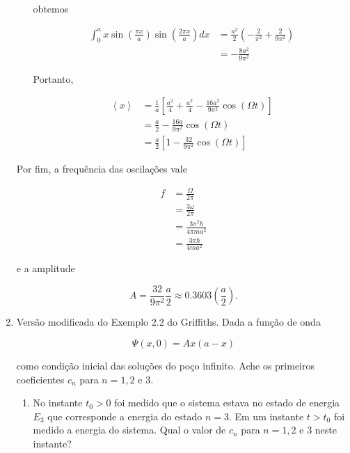 \documentclass[a4paper, 12pt, notitlepage]{article}
\begin{document}
\begin{enumerate}
\begin{enumerate}
  obtemos
  
  \begin{align*}
  \int_0^a x \sin\left(\frac{\pi x}{a}\right) \sin\left(\frac{2\pi x}{a}\right) dx &= \frac{a^2}{2} \left(-\frac{2}{\pi^2} + \frac{2}{9\pi^2}\right) \\
  &= -\frac{8a^2}{9\pi^2}
  \end{align*}
  
  Portanto,
  
  \begin{align*}
  \left\langle x \right\rangle &= \frac{1}{a}\left[\frac{a^2}{4} + \frac{a^2}{4} - \frac{16a^2}{9\pi^2}\cos\left(\Omega t\right) \right] \\
  &= \frac{a}{2} - \frac{16 a}{9 \pi^2} \cos\left(\Omega t\right) \\
  &= \frac{a}{2}\left[1 - \frac{32}{9\pi^2}\cos\left(\Omega t\right)\right]
  \end{align*}
  \end{enumerate}
  
  Por fim, a frequência das oscilações vale
  
  \begin{align*}
  f &= \frac{\Omega}{2\pi} \\
  &= \frac{3\omega}{2\pi} \\
  &= \frac{3\pi^2 \hbar}{4\pi ma^2} \\
  &= \frac{3 \pi \hbar}{4 m a^2}
  \end{align*}
  
  e a amplitude
  
  \begin{equation*}
  A = \frac{32}{9\pi^2} \frac{a}{2} \approx 0.3603 \left(\frac{a}{2}\right).
  \end{equation*}
 
\item Versão modificada do Exemplo 2.2 do Griffiths. Dada a função de onda

  \begin{equation*}
  \Psi(x, 0) = Ax(a-x)
  \end{equation*}
  
  \noindent como condição inicial das soluções do poço infinito. Ache os primeiros coeficientes $c_n$ para $n = 1, 2$ e $3$.
  
  \begin{enumerate}
    \item No instante $t_0 > 0$ foi medido que o sistema estava no estado de energia $E_3$ que corresponde a energia do estado $n = 3$. Em um instante $t > t_0$ foi medido a energia do sistema. Qual o valor de $c_n$ para $n = 1, 2$ e $3$ neste instante?
  \end{enumerate}


\end{enumerate}
\end{document}
